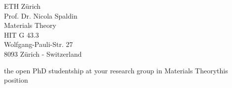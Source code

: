 \documentclass{letter}
\begin{document}
\begin{letter}{ETH Zürich\\
Prof. Dr. Nicola Spaldin\\
Materials Theory\\
HIT G 43.3\\
Wolfgang-Pauli-Str. 27\\
8093 Zürich - Switzerland}

\begin{content}{the open PhD studentship at your research group in Materials Theory}{this position}
\teaching

\phdmot

\end{content}

\end{letter}
\end{document}

